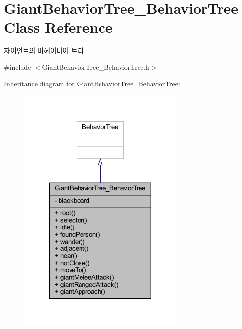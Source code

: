 \hypertarget{class_giant_behavior_tree___behavior_tree}{}\section{Giant\+Behavior\+Tree\+\_\+\+Behavior\+Tree Class Reference}
\label{class_giant_behavior_tree___behavior_tree}


자이언트의 비헤이비어 트리  




{\ttfamily \#include $<$Giant\+Behavior\+Tree\+\_\+\+Behavior\+Tree.\+h$>$}



Inheritance diagram for Giant\+Behavior\+Tree\+\_\+\+Behavior\+Tree\+:\nopagebreak
\begin{figure}[H]
\begin{center}
\leavevmode
\includegraphics[width=236pt]{class_giant_behavior_tree___behavior_tree__inherit__graph}
\end{center}
\end{figure}


